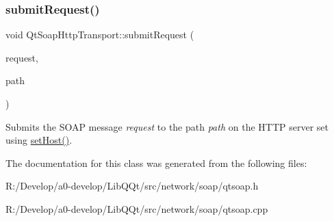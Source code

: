 \subsubsection{\texorpdfstring{submit\+Request()}{submitRequest()}}
{\footnotesize\ttfamily void Qt\+Soap\+Http\+Transport\+::submit\+Request (\begin{DoxyParamCaption}\item[{\mbox{\hyperlink{class_qt_soap_message}{Qt\+Soap\+Message}} \&}]{request,  }\item[{const Q\+String \&}]{path }\end{DoxyParamCaption})}

Submits the S\+O\+AP message {\itshape request} to the path {\itshape path} on the H\+T\+TP server set using \mbox{\hyperlink{class_qt_soap_http_transport_a7dfb69fe0e076407cda0093ee99c4988}{set\+Host()}}. 

The documentation for this class was generated from the following files\+:\begin{DoxyCompactItemize}
\item 
R\+:/\+Develop/a0-\/develop/\+Lib\+Q\+Qt/src/network/soap/qtsoap.\+h\item 
R\+:/\+Develop/a0-\/develop/\+Lib\+Q\+Qt/src/network/soap/qtsoap.\+cpp\end{DoxyCompactItemize}
